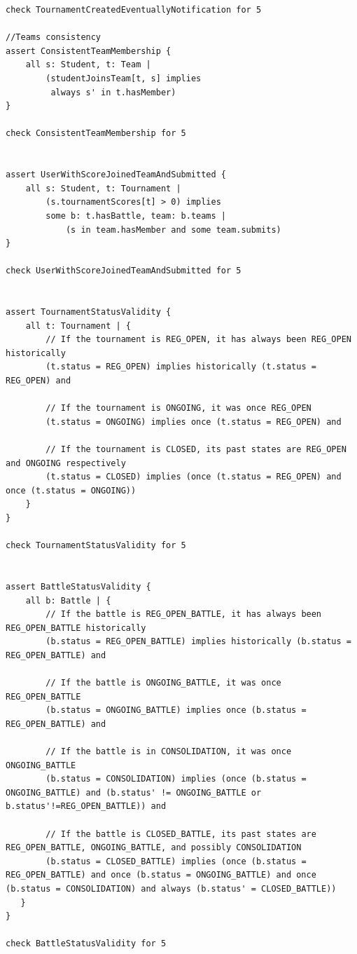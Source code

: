 \begin{lstlisting}[language=alloy]
check TournamentCreatedEventuallyNotification for 5

//Teams consistency
assert ConsistentTeamMembership {
    all s: Student, t: Team | 
        (studentJoinsTeam[t, s] implies 
         always s' in t.hasMember)
}

check ConsistentTeamMembership for 5


assert UserWithScoreJoinedTeamAndSubmitted {
    all s: Student, t: Tournament | 
        (s.tournamentScores[t] > 0) implies 
        some b: t.hasBattle, team: b.teams | 
            (s in team.hasMember and some team.submits)
}

check UserWithScoreJoinedTeamAndSubmitted for 5 


assert TournamentStatusValidity {
    all t: Tournament | {
        // If the tournament is REG_OPEN, it has always been REG_OPEN historically
        (t.status = REG_OPEN) implies historically (t.status = REG_OPEN) and

        // If the tournament is ONGOING, it was once REG_OPEN
        (t.status = ONGOING) implies once (t.status = REG_OPEN) and

        // If the tournament is CLOSED, its past states are REG_OPEN and ONGOING respectively
        (t.status = CLOSED) implies (once (t.status = REG_OPEN) and once (t.status = ONGOING))
    }
}

check TournamentStatusValidity for 5


assert BattleStatusValidity {
    all b: Battle | {
        // If the battle is REG_OPEN_BATTLE, it has always been REG_OPEN_BATTLE historically
        (b.status = REG_OPEN_BATTLE) implies historically (b.status = REG_OPEN_BATTLE) and

        // If the battle is ONGOING_BATTLE, it was once REG_OPEN_BATTLE
        (b.status = ONGOING_BATTLE) implies once (b.status = REG_OPEN_BATTLE) and

        // If the battle is in CONSOLIDATION, it was once ONGOING_BATTLE
        (b.status = CONSOLIDATION) implies (once (b.status = ONGOING_BATTLE) and (b.status' != ONGOING_BATTLE or b.status'!=REG_OPEN_BATTLE)) and

        // If the battle is CLOSED_BATTLE, its past states are REG_OPEN_BATTLE, ONGOING_BATTLE, and possibly CONSOLIDATION
        (b.status = CLOSED_BATTLE) implies (once (b.status = REG_OPEN_BATTLE) and once (b.status = ONGOING_BATTLE) and once (b.status = CONSOLIDATION) and always (b.status' = CLOSED_BATTLE))
   } 
}

check BattleStatusValidity for 5


\end{lstlisting}
